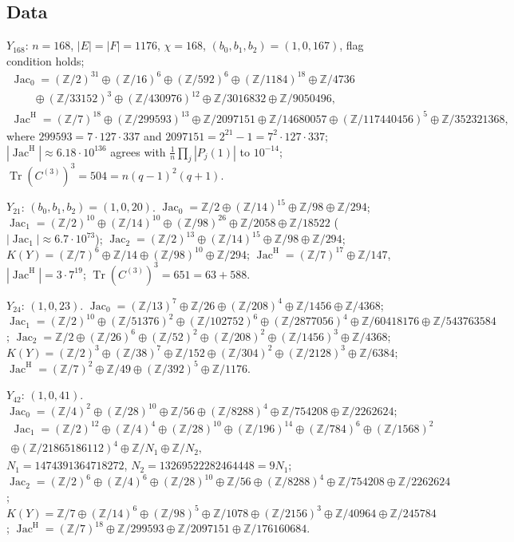 \documentclass[11pt]{amsart}
\numberwithin{equation}{section}
\theoremstyle{definition}
\theoremstyle{remark}
\newcommand{\Z}{\mathbb{Z}}
\newcommand{\Jac}{\operatorname{Jac}}
\newcommand{\Tr}{\operatorname{Tr}}
\newcommand{\JacH}{\Jac^{\mathrm{H}}}
\newcommand{\Cthree}{C^{(3)}}
\begin{document}
\subsection*{Data}
$Y_{168}$: $n=168$, $|E|=|F|=1176$, $\chi=168$, $(b_0,b_1,b_2)=(1,0,167)$, flag condition
holds;
\begin{gather*}
\Jac_0=(\Z/2)^{31}\oplus(\Z/16)^{6}\oplus(\Z/592)^{6}\oplus(\Z/1184)^{18}\oplus\Z/4736\\
\qquad\oplus(\Z/33152)^{3}\oplus(\Z/430976)^{12}\oplus\Z/3016832\oplus\Z/9050496,\\
\JacH=(\Z/7)^{18}\oplus(\Z/299593)^{13}\oplus\Z/2097151\oplus\Z/14680057\oplus
(\Z/117440456)^{5}\oplus\Z/352321368,
\end{gather*}
where $299593=7\cdot127\cdot337$ and $2097151=2^{21}-1=7^{2}\cdot127\cdot337$;
$|\JacH|\approx6.18\cdot10^{136}$ agrees with $\frac1n\prod_j|P_j(1)|$ to $10^{-14}$;
$\Tr(\Cthree)^{3}=504=n(q-1)^{2}(q+1)$.

$Y_{21}$: $(b_0,b_1,b_2)=(1,0,20)$. $\Jac_0=\Z/2\oplus(\Z/14)^{15}\oplus\Z/98\oplus\Z/294$;
$\Jac_1=(\Z/2)^{10}\oplus(\Z/14)^{10}\oplus(\Z/98)^{26}\oplus\Z/2058\oplus\Z/18522$
($|\Jac_1|\approx6.7\cdot10^{73}$); $\Jac_2=(\Z/2)^{13}\oplus(\Z/14)^{15}\oplus\Z/98\oplus\Z/294$;
$K(Y)=(\Z/7)^{6}\oplus\Z/14\oplus(\Z/98)^{10}\oplus\Z/294$;
$\JacH=(\Z/7)^{17}\oplus\Z/147$, $|\JacH|=3\cdot7^{19}$; $\Tr(\Cthree)^{3}=651=63+588$.

$Y_{24}$: $(1,0,23)$. $\Jac_0=(\Z/13)^{7}\oplus\Z/26\oplus(\Z/208)^{4}\oplus\Z/1456\oplus\Z/4368$;
$\Jac_1=(\Z/2)^{10}\oplus(\Z/51376)^{2}\oplus(\Z/102752)^{6}\oplus(\Z/2877056)^{4}\oplus
\Z/60418176\oplus\Z/543763584$; $\Jac_2=\Z/2\oplus(\Z/26)^{6}\oplus(\Z/52)^{2}\oplus(\Z/208)^{2}
\oplus(\Z/1456)^{3}\oplus\Z/4368$; $K(Y)=(\Z/2)^{3}\oplus(\Z/38)^{7}\oplus\Z/152\oplus(\Z/304)^{2}
\oplus(\Z/2128)^{3}\oplus\Z/6384$; $\JacH=(\Z/7)^{2}\oplus\Z/49\oplus(\Z/392)^{5}\oplus\Z/1176$.

$Y_{42}$: $(1,0,41)$. $\Jac_0=(\Z/4)^{2}\oplus(\Z/28)^{10}\oplus\Z/56\oplus(\Z/8288)^{4}\oplus
\Z/754208\oplus\Z/2262624$;
\begin{gather*}
\Jac_1=(\Z/2)^{12}\oplus(\Z/4)^{4}\oplus(\Z/28)^{10}\oplus(\Z/196)^{14}\oplus(\Z/784)^{6}
\oplus(\Z/1568)^{2}\\
\oplus(\Z/21865186112)^{4}\oplus\Z/N_1\oplus\Z/N_2 ,
\end{gather*}
$N_1=1474391364718272$, $N_2=13269522282464448=9N_1$;
$\Jac_2=(\Z/2)^{6}\oplus(\Z/4)^{6}\oplus(\Z/28)^{10}\oplus\Z/56\oplus
(\Z/8288)^{4}\oplus\Z/754208\oplus\Z/2262624$; $K(Y)=\Z/7\oplus(\Z/14)^{6}\oplus(\Z/98)^{5}\oplus
\Z/1078\oplus(\Z/2156)^{3}\oplus\Z/40964\oplus\Z/245784$;
$\JacH=(\Z/7)^{18}\oplus\Z/299593\oplus\Z/2097151\oplus\Z/176160684$.
\end{document}
